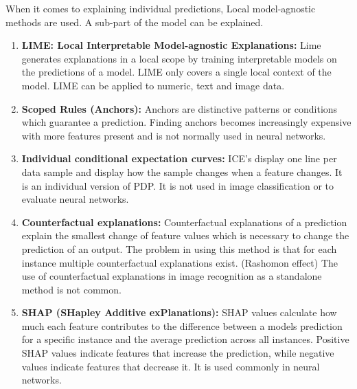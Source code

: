 When it comes to explaining individual predictions, Local model-agnostic methods are used. A sub-part of the model can be explained.

\begin{enumerate}
	\item \textbf{LIME: Local Interpretable Model-agnostic Explanations:} Lime generates explanations in a local scope by training interpretable models on the predictions of a model. LIME only covers a single local context of the model. LIME can be applied to numeric, text and image data.
	\item \textbf{Scoped Rules (Anchors):} Anchors are distinctive patterns or conditions which guarantee a prediction. Finding anchors becomes increasingly expensive with more features present and is not normally used in neural networks. \cite{ribeiro2018}
	\item \textbf{Individual conditional expectation curves:} ICE's display one line per data sample and display how the sample changes when a feature changes. It is an individual version of PDP. \cite{goldstein2014peeking} It is not used in image classification or to evaluate neural networks.
	\item \textbf{Counterfactual explanations:} Counterfactual explanations of a prediction explain the smallest change of feature values which is necessary to change the prediction of an output. The problem in using this method is that for each instance multiple counterfactual explanations exist. (Rashomon effect) The use of counterfactual explanations in image recognition as a standalone method is not common.
	\item \textbf{SHAP (SHapley Additive exPlanations):} SHAP values \cite{lundberg2017unified} calculate how much each feature contributes to the difference between a models prediction for a specific instance and the average prediction across all instances. Positive SHAP values indicate features that increase the prediction, while negative values indicate features that decrease it. It is used commonly in neural networks.
\end{enumerate}

